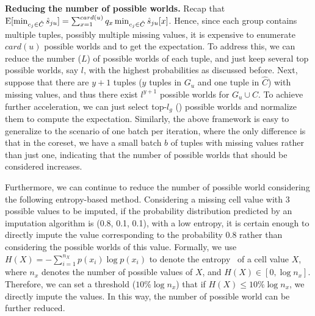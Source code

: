 \noindent \textbf{Reducing the number of possible worlds.} Recap that $\mathrm{E}[\min_{c_j\in \hat {C}}\hat{s}_{ju}] = \sum_{x=1}^{card(u)} q_x \min_{c_j \in \hat{C}} \hat{s}_{ju}[x]$.
%
Hence, since each group contains multiple tuples, possibly multiple missing values,  it is expensive to enumerate $card(u)$ possible worlds and  to get the expectation. 
To address this,   we can reduce the number ($L$) of possible worlds of each tuple, and just keep several top possible worlds, say $l$, with the highest probabilities as discussed before. 
Next, suppose that there are $y+1$ tuples ($y$ tuples in $G_u$ and one tuple in $\hat{C}$) with missing values, and thus there exist $l^{y+1}$ possible worlds for $G_u \cup \hat{C}$. To achieve further acceleration, we can just select top-$l_g$ () possible worlds and normalize them to compute the expectation.
Similarly, the above framework is easy to generalize to the scenario of one batch per iteration, where the only difference is that in the coreset, we have a small batch $b$ of tuples with missing values rather than just one, indicating that the number of possible worlds that should be considered increases. 

Furthermore, we can continue to  reduce the number of possible world considering the following entropy-based method. Considering a missing cell value with 3 possible values to be imputed, if the probability distribution predicted by an imputation algorithm  is (0.8, 0.1, 0.1), \ie with a low entropy,  it is certain enough to directly impute the value corresponding to the probability 0.8 rather than considering the possible worlds of this value.
Formally,  we use $H(X) = -\sum_{i=1}^{n_X} p(x_i)\log p(x_i)$ to denote the entropy~\cite{entropy} of a cell value $X$, where $n_x$ denotes the number of possible values of $X$, and $H(X) \in [0, \log n_x ]$. Therefore, we can set a threshold (\eg $10\% \log n_x$) that if $H(X) \leq 10\%\log n_x$, we directly impute the values. In this way, the number of possible world can be further reduced.


